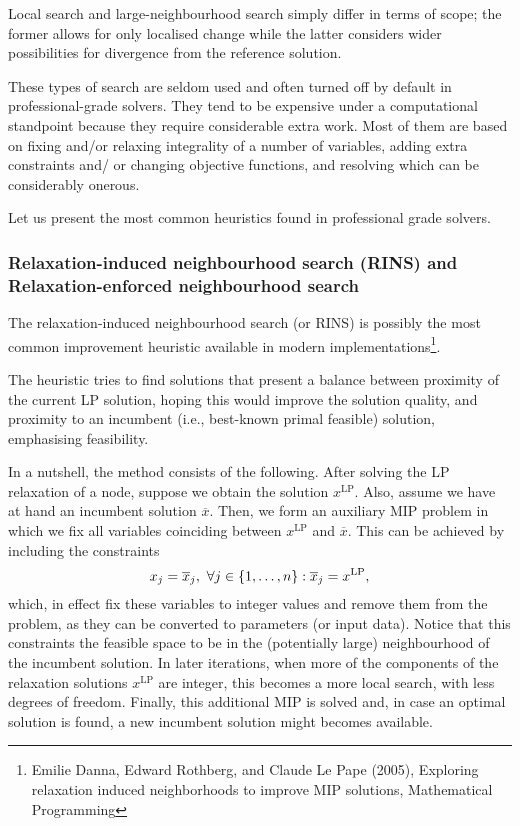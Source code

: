 Local search and large-neighbourhood search simply differ in terms of scope; the former allows for only localised change while the latter considers wider possibilities for divergence from the reference solution.

These types of search are seldom used and often turned off by default in professional-grade solvers. They tend to be expensive under a computational standpoint because they require considerable extra work. Most of them are based on fixing and/or relaxing integrality of a number of variables, adding extra constraints and/ or changing objective functions, and resolving which can be considerably onerous.

Let us present the most common heuristics found in professional grade solvers. 


\subsubsection{Relaxation-induced neighbourhood search (RINS) and Relaxation-enforced neighbourhood search}

The relaxation-induced neighbourhood search (or RINS) is possibly the most common improvement heuristic available in modern implementations\footnote{Emilie Danna, Edward Rothberg, and Claude Le Pape (2005), Exploring relaxation induced neighborhoods to improve MIP solutions, Mathematical Programming}. 

The heuristic tries to find solutions that present a balance between proximity of the current LP solution, hoping this would improve the solution quality, and proximity to an incumbent (i.e., best-known primal feasible) solution, emphasising feasibility.

In a nutshell, the method consists of the following. After solving the LP relaxation of a node, suppose we obtain the solution $x^{\text{LP}}$. Also, assume we have at hand an incumbent solution $\overline{x}$. Then, we form an auxiliary MIP problem in which we fix all variables coinciding between $x^{\text{LP}}$ and $\overline{x}$. This can be achieved by including the constraints
	\begin{equation*}
		x_j = \overline{x}_j, \ \forall j \in \left\{ 1,\dots,n \right \} : \overline{x}_j = x^\text{LP},	
	\end{equation*}
	which,  in effect fix these variables to integer values and remove them from the problem, as they can be converted to parameters (or input data). Notice that this constraints the feasible space to be in the (potentially large) neighbourhood of the incumbent solution. In later iterations, when more of the components of the relaxation solutions $x^{\text{LP}}$ are integer, this becomes a more local search, with less degrees of freedom. Finally, this additional MIP is solved and, in case an optimal solution is found, a new incumbent solution might becomes available.

